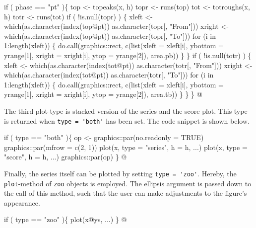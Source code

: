 \documentclass[a4paper]{article}
\begin{document}
\nwenddocs{}\endmoddef
if ( phase == "pt" )\{
    top <- topeaks(x, h)
    topr <- runs(top)
    tot <- totroughs(x, h)
    totr <- runs(tot)
    if ( !is.null(topr) ) \{
        xleft <- which(as.character(index(top@pt)) %
                       as.character(topr[, "From"]))
        xright <- which(as.character(index(top@pt)) %
                        as.character(topr[, "To"]))
        for (i in 1:length(xleft)) \{
            do.call(graphics::rect, c(list(xleft = xleft[i],
                                           ybottom = yrange[1],
                                           xright = xright[i],
                                           ytop = yrange[2]),
                                      area.pb))
        \}
    \}
    if ( !is.null(totr) ) \{
        xleft <- which(as.character(index(tot@pt)) %
                       as.character(totr[, "From"]))
        xright <- which(as.character(index(tot@pt)) %
                        as.character(totr[, "To"]))
        for (i in 1:length(xleft)) \{
            do.call(graphics::rect, c(list(xleft = xleft[i],
                                           ybottom = yrange[1],
                                           xright = xright[i],
                                           ytop = yrange[2]),
                                      area.tb))
        \}
    \}
\}
\nwendcode{}@

The third plot-type is stacked version of the series and the score
plot. This type is returned when \verb?type = 'both'? has been set. The
code snippet is shown below.

\nwenddocs{}\endmoddef
if ( type == "both" )\{
    op <- graphics::par(no.readonly = TRUE)
    graphics::par(mfrow = c(2, 1))
    plot(x, type = "series", h = h, ...)
    plot(x, type = "score", h = h, ...)
    graphics::par(op)
\}
\nwendcode{}@

Finally, the series itself can be plotted by setting
\verb?type = 'zoo'?. Hereby, the \verb?plot?-method of \verb?zoo? objects is
employed. The ellipsis argument is passed down to the call of this
method, such that the user can make adjustments to the figure's
appearance.

\nwenddocs{}\endmoddef
if ( type == "zoo" )\{
    plot(x@ys, ...)
\}
\nwendcode{}@
\end{document}
